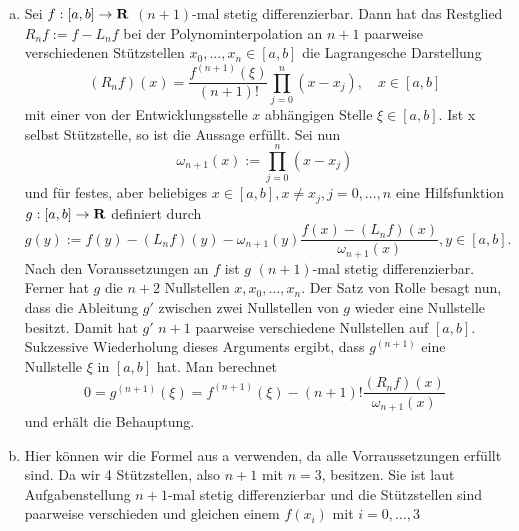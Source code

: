 \documentclass[11pt,a4paper]{article}
\begin{document}
        \begin{enumerate}[a)]
          \item Sei $f: [a,b] \to {\bf R}$ $(n+1)$-mal stetig differenzierbar. Dann hat das Restglied $R_nf := f - L_n f$ bei der Polynominterpolation an $n+1$ paarweise verschiedenen Stützstellen $x_0,...,x_n \in [a,b]$ die Lagrangesche Darstellung
          \begin{equation*}
            (R_n f)(x) = \frac{f^{(n+1)} ( \xi )}{(n+1) !} \prod_{j=0}^n (x-x_j),\quad x \in [a,b]
          \end{equation*}
          mit einer von der Entwicklungsstelle $x$ abhängigen Stelle  $\xi \in [a,b]$.
          Ist x selbst Stützstelle, so ist die Aussage erfüllt. Sei nun
          \begin{equation*}
            \omega _{n+1} (x) := \prod_{j=0}^n (x-x_j)
          \end{equation*}
          und für festes, aber beliebiges $x \in [a,b], x \ne x_j,  j=0,...,n$ eine Hilfsfunktion $g: [a,b] \to {\bf R}$ definiert durch
          \begin{equation*}
            g(y):= f(y)-(L_n f)(y) - \omega _{n+1} (y) \frac{f(x)-(L_n f)(x)}{ \omega _{n+1}(x)},y \in [a,b] .
          \end{equation*}
          Nach den Voraussetzungen an $f$ ist $g$ $(n+1)$-mal stetig differenzierbar. Ferner hat $g$ die $n+2$ Nullstellen $x,x_0,\dots,x_n$. Der Satz von Rolle besagt nun, dass die Ableitung $g'$ zwischen zwei Nullstellen von $g$ wieder eine Nullstelle besitzt. Damit hat $g'$ $n+1$ paarweise verschiedene Nullstellen auf $[a,b]$. Sukzessive Wiederholung dieses Arguments ergibt, dass $g^{(n+1)}$ eine Nullstelle  $\xi$  in $[a,b]$ hat. Man berechnet
          \begin{equation*}
            0 = g^{(n+1)} ( \xi ) = f^{(n+1)} ( \xi ) - (n+1)! \frac{(R_n f)(x)}{ \omega_{n+1} (x) }
          \end{equation*}
          und erhält die Behauptung.
          \item Hier können wir die Formel aus a verwenden, da alle Vorraussetzungen erfüllt sind. Da wir 4 Stützstellen, also $n+1$ mit $n=3$, besitzen. Sie ist laut Aufgabenstellung $n+1$-mal stetig differenzierbar und die Stützstellen sind paarweise verschieden und gleichen einem $f(x_i)$ mit $i=0,\dots,3$
        \end{enumerate}
\end{document}
